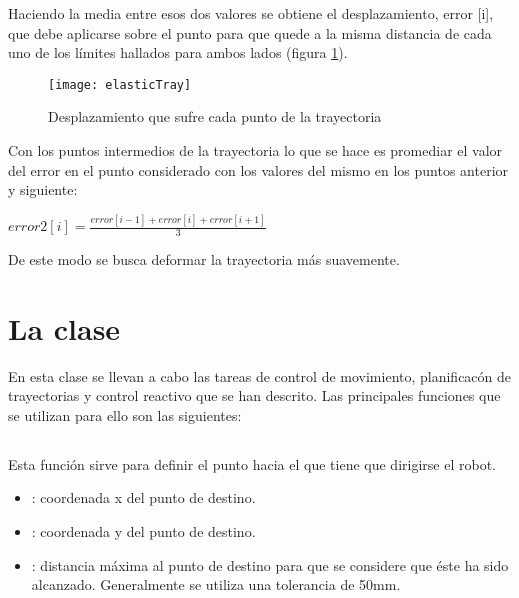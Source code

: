 Haciendo la media entre esos dos valores se obtiene el desplazamiento, error [i], que debe aplicarse sobre el punto para que quede a la misma distancia de cada uno de los límites hallados para ambos lados (figura \ref{fg:elasticTray}).

\begin{figure}[h]
  \centering\texttt{[image: elasticTray]}\\
  \caption{Desplazamiento que sufre cada punto de la trayectoria}\label{fg:elasticTray}
\end{figure}

Con los puntos intermedios de la trayectoria lo que se hace es promediar el valor del error en el punto considerado con los valores del mismo en los puntos anterior y siguiente:

\begin{center}
$error2[i] = \frac{error[i-1] + error[i] + error[i+1]}{3}$
\end{center}

\noindent
De este modo se busca deformar la trayectoria más suavemente.

\section{La clase }
En esta clase se llevan a cabo las tareas de control de movimiento, planificacón de trayectorias y control reactivo que se han descrito. Las principales funciones que se utilizan para ello son las siguientes:

\subsection{}

\noindent
{}

\noindent
Esta función sirve para definir el punto hacia el que tiene que dirigirse el robot.

\begin{itemize}
  \item {}: coordenada x del punto de destino.
  \item {}: coordenada y del punto de destino.
  \item {}: distancia máxima al punto de destino para que se considere que éste ha sido alcanzado. Generalmente se utiliza una tolerancia de 50mm.
\end{itemize}

